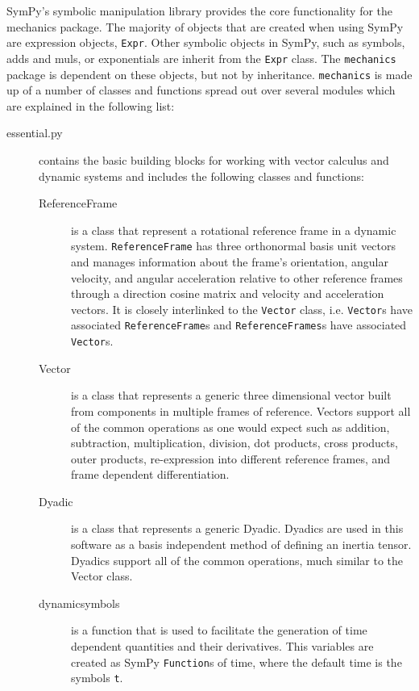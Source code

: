 \documentclass[twocolumn,10pt]{asme2e}
\begin{document}
SymPy's symbolic manipulation library provides the core functionality for the
mechanics package. The majority of objects that are created when using SymPy
are expression objects, \verb|Expr|. Other symbolic objects in SymPy, such as
symbols, adds and muls, or exponentials are inherit from the \verb|Expr| class.
The \verb|mechanics| package is dependent on these objects, but not by
inheritance. \verb|mechanics| is made up of a number of classes and functions
spread out over several modules which are explained in the following list:
%
\begin{description}
  \item[essential.py] contains the basic building blocks for working with
    vector calculus and dynamic systems and includes the following classes and
    functions:
    \begin{description}
      \item[ReferenceFrame] is a class that represent a rotational reference
        frame in a dynamic system. \verb|ReferenceFrame| has three orthonormal
        basis unit vectors and manages information about the frame's
        orientation, angular velocity, and angular acceleration relative to
        other reference frames through a direction cosine matrix and velocity
        and acceleration vectors. It is closely interlinked to the
        \verb|Vector| class, i.e. \verb|Vector|s have associated
        \verb|ReferenceFrame|s and \verb|ReferenceFrames|s have associated
        \verb|Vector|s.
      \item[Vector] is a class that represents a generic three dimensional
        vector built from components in multiple frames of reference. Vectors
        support all of the common operations as one would expect such as
        addition, subtraction, multiplication, division, dot products, cross
        products, outer products, re-expression into different reference
        frames, and frame dependent differentiation.
      \item[Dyadic] is a class that represents a generic Dyadic. Dyadics are
        used in this software as a basis independent method of defining an
        inertia tensor. Dyadics support all of the common operations, much
        similar to the Vector class.
      \item[dynamicsymbols] is a function that is used to facilitate the generation
        of time dependent quantities and their derivatives. This variables are
        created as SymPy \verb|Function|s of time, where the default time is
        the symbols \verb|t|.

\end{description}
\end{description}
\end{document}
